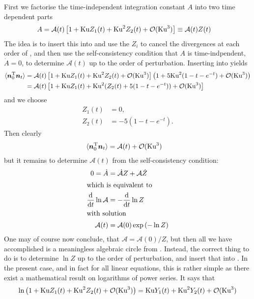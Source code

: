 \documentclass[thesis.tex]{subfiles}
\begin{document}
First we factorise the time-independent integration constant $A$ into two time dependent parts
\begin{align}
	A &= \mathcal A (t)\left[1+\ku Z_1(t)+\ku^2 Z_2(t)+\mathcal O(\ku^3)\right] \equiv \mathcal A(t)Z(t)\eqnlab{rg1}
\end{align}
The idea is to insert this into  and use the $Z_i$ to cancel the divergences at each order of \ku, and then use the self-consistency condition that $A$ is time-indpendent, $\dot A=0$, to determine $\mathcal A(t)$ up to the order of perturbation.
Inserting  into  yields
\begin{align*}
\langle \mbox{\boldmath$n$}_0^{\mathrm T} \mbox{\boldmath$n$}_t\rangle &= \mathcal A (t)\left[1+\mbox{Ku} Z_1(t)+\mbox{Ku}^2 Z_2(t)+\mathcal O(\mbox{Ku}^3)\right]\left(1 + 5\mbox{Ku}^2 (1-t-e^{-t}) + \mathcal O(\mbox{Ku} ^3)\right) \\
&= \mathcal A(t)\left[1 + \mbox{Ku} Z_1(t) + \mbox{Ku}^2(Z_2(t)+5(1-t-e^{-t}))+\mathcal O(\mbox{Ku}^3) \right]
\end{align*}
and we choose
\begin{align*}
	Z_1(t) &= 0, \\
	Z_2(t) &= -5(1-t-e^{-t}).
\end{align*}
Then clearly 
\begin{align}
	\langle \ve n_0\transpose \ve n_t\rangle &= \mathcal A (t) + \mathcal O(\ku^3)\eqnlab{rg1a}
\end{align}
but it remains to determine $\mathcal A(t)$ from the self-consistency condition:
\begin{align}
	0 = \dot A &= \dot{\mathcal A}Z + \mathcal A \dot Z \nn\\
	\intertext{which is equivalent to}
	\frac{\rd}{\rd t}\ln\mathcal A &= -\frac{\rd}{\rd t}\ln Z  \nn\\
	\intertext{with solution}
	\mathcal A(t) &= \mathcal A(0) \exp\left(-\ln Z\right)\eqnlab{rg2}
\end{align}
One may of course now conclude, that $\mathcal A=\mathcal A(0)/Z$, but then all we have accomplished is a meaningless algebraic circle from . Instead, the correct thing to do is to determine $\ln Z$ up to the order of perturbation, and insert that into . In the present case, and in fact for all linear equations, this is rather simple as there exist a mathematical result on logarithms of power series. It says that
\begin{align*}
	\ln \left(1+\mbox{Ku} Z_1(t)+\mbox{Ku}^2 Z_2(t)+\mathcal O(\mbox{Ku}^3)\right) = \mbox{Ku} Y_1(t) + \mbox{Ku}^2 Y_2(t) + \mathcal O(\mbox{Ku}^3)
\end{align*}
\end{document}
